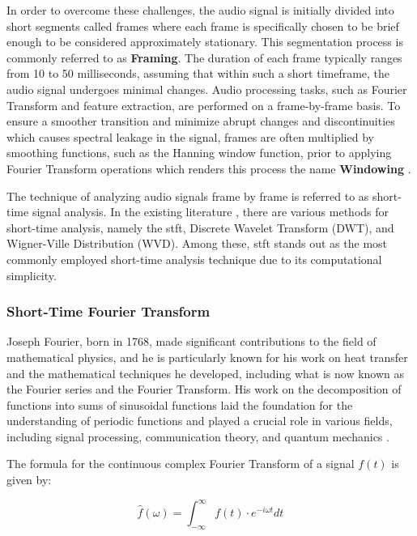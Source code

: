 In order to overcome these challenges, the audio signal is initially divided into short segments called frames where each frame is specifically chosen to be brief enough to be considered approximately stationary. This segmentation process is commonly referred to as \textbf{Framing}. The duration of each frame typically ranges from 10 to 50 milliseconds, assuming that within such a short timeframe, the audio signal undergoes minimal changes. Audio processing tasks, such as Fourier Transform and feature extraction, are performed on a frame-by-frame basis. To ensure a smoother transition and minimize abrupt changes and discontinuities which causes spectral leakage in the signal, frames are often multiplied by smoothing functions, such as the Hanning window function, prior to applying Fourier Transform operations which renders this process the name \textbf{Windowing} \cite{Abreha2014}.

The technique of analyzing audio signals frame by frame is referred to as short-time signal analysis. In the existing literature \cite{Debnath2014}, there are various methods for short-time analysis, namely the \gls{stft}, Discrete Wavelet Transform (DWT), and Wigner-Ville Distribution (WVD). Among these, \gls{stft} stands out as the most commonly employed short-time analysis technique due to its computational simplicity.


\subsubsection{Short-Time Fourier Transform}
\label{subsubsec:audio_fundamentals_fourier_transform}

Joseph Fourier, born in 1768, made significant contributions to the field of mathematical physics, and he is particularly known for his work on heat transfer and the mathematical techniques he developed, including what is now known as the Fourier series and the Fourier Transform. His work on the decomposition of functions into sums of sinusoidal functions laid the foundation for the understanding of periodic functions and played a crucial role in various fields, including signal processing, communication theory, and quantum mechanics \cite{Debnath2014}.

The formula for the continuous complex Fourier Transform of a signal $f(t)$ is given by:

\begin{equation}
    \label{eq:frmwk_audio_fund_fft}
    \hat{f}(\omega)=\int_{-\infty}^{\infty} f(t) \cdot e^{-i \omega t} d t
\end{equation}

